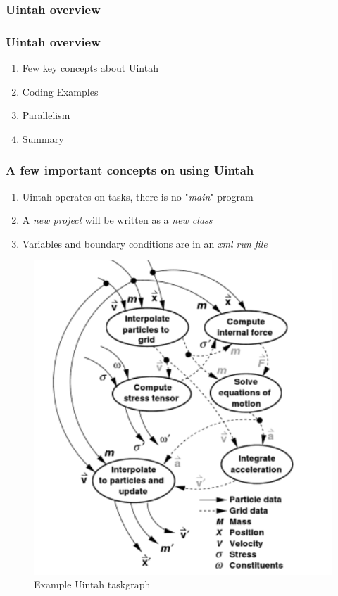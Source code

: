 \documentclass{beamer}
\begin{document}
\begin{frame}
 \frametitle{Uintah overview}
\end{frame}

\begin{frame}
 \frametitle{Uintah overview}
 \begin{enumerate}
  \item Few key concepts about Uintah
  \item Coding Examples
  \item Parallelism
  \item Summary
 \end{enumerate}
\end{frame}


\begin{frame}
 \frametitle{A few important concepts on using Uintah}
 \begin{enumerate}
  \item Uintah operates on tasks, there is no "\emph{main}" program
  \item A \emph{new project} will be written as a \emph{new class}
  \item Variables and boundary conditions are in an \emph{xml run file}
 \end{enumerate}
 \begin{figure}
  \centering
  \includegraphics[height=0.5\textheight]{taskgraph.png}
  \caption{\tiny{Example Uintah taskgraph}}
 \end{figure}
\end{frame}
\end{document}
